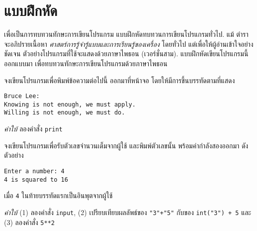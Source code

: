 \section{แบบฝึกหัด}

\begin{Parallel}[c]{0.48\textwidth}{0.34\textwidth}
\end{Parallel}
\vspace{1cm}



เพื่อเป็นการทบทวนทักษะการเขียนโปรแกรม
แบบฝึกหัดทบทวนการเขียนโปรแกรมทั่วไป. 
%
%
แม้ ตำรา จะอภิปรายเนื้อหา \textit{ศาสตร์การรู้จำรู้แบบและการเรียนรู้ของเครื่อง} โดยทั่วไป
แต่เพื่อให้ผู้อ่านเข้าใจอย่างชัดเจน ตัวอย่างโปรแกรมที่ใช้จะแสดงด้วยภาษาไพธอน (เวอร์ชั่นสาม).
แบบฝึกหัดเขียนโปรแกรมนี้ออกแบบมา
เพื่อทบทวนทักษะการเขียนโปรแกรมด้วยภาษาไพธอน

\begin{Exercise}
\label{prog: print}
จงเขียนโปรแกรมเพื่อพิมพ์ข้อความต่อไปนี้
ออกมาที่หน้าจอ โดยให้มีการขึ้นบรรทัดตามที่แสดง 

\begin{verbatim}
Bruce Lee:
Knowing is not enough, we must apply.
Willing is not enough, we must do.
\end{verbatim}

\textit{คำใบ้} ลองคำสั่ง \texttt{print}

\end{Exercise}

\begin{Exercise}
\label{prog: input}
จงเขียนโปรแกรมเพื่อรับตัวเลขจำนวนเต็มจากผู้ใช้ และพิมพ์ตัวเลขนั้น พร้อมค่ากำลังสองออกมา ดังตัวอย่าง

\begin{verbatim}
Enter a number: 4
4 is squared to 16
\end{verbatim}
เมื่อ \verb|4| ในท้ายบรรทัดแรกเป็นอินพุตจากผู้ใช้

\textit{คำใบ้} 
(1) ลองคำสั่ง \texttt{input}, 
(2) เปรียบเทียบผลลัพธ์ของ \verb|"3"+"5"|
กับของ \verb|int("3") + 5|
และ (3) ลองคำสั่ง \verb|5**2|
	
\end{Exercise}

